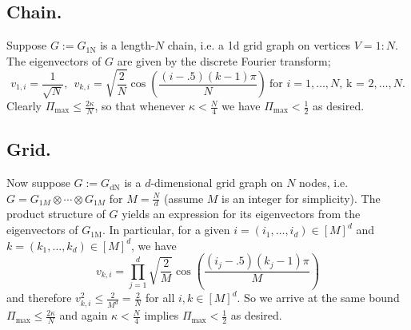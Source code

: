 \documentclass{article}
\newcommand{\1}{\mathbf{1}}
\theoremstyle{alden}
\theoremstyle{aldenthm}
\theoremstyle{definition}
\theoremstyle{remark}
\begin{document}
\subsection{Chain.}
Suppose $G := G_{\mathrm{1N}}$ is a length-$N$ chain, i.e. a 1d grid graph on vertices $V = 1:N$. The eigenvectors of $G$ are given by the discrete Fourier transform;
\begin{equation*}
v_{1,i} = \frac{1}{\sqrt{N}},~~ v_{k,i} =\sqrt{\frac{2}{N}} \cos\left(\frac{(i - .5)(k - 1)\pi}{N}\right)~ \textrm{for $i = 1,\ldots,N$, k = $2,\ldots,N$.}
\end{equation*}
Clearly $\Pi_{\max} \leq \frac{2\kappa}{N}$, so that whenever $\kappa < \frac{N}{4}$ we have $\Pi_{\max} < \frac{1}{2}$ as desired.

\subsection{Grid.}
Now suppose $G := G_{\mathrm{dN}}$ is a $d$-dimensional grid graph on $N$ nodes, i.e. $G = G_{1M} \otimes \cdots \otimes G_{1M}$ for $M = \frac{N}{d}$ (assume $M$ is an integer for simplicity). The product structure of $G$ yields an expression for its eigenvectors from the eigenvectors of $G_{\mathrm{1M}}$. In particular, for a given $i = (i_1,\ldots,i_d) \in [M]^d$ and $k = (k_1,\ldots,k_d) \in [M]^d$, we have
\begin{equation*}
v_{k,i} = \prod_{j = 1}^{d} \sqrt{\frac{2}{M}} \cos\left(\frac{(i_j - .5)(k_j - 1)\pi}{M}\right)
\end{equation*}
and therefore $v_{k,i}^2 \leq \frac{2}{M^{d}} = \frac{2}{N}$ for all $i,k \in [M]^d$. So we arrive at the same bound $\Pi_{\max} \leq \frac{2\kappa}{N}$ and again $\kappa < \frac{N}{4}$ implies $\Pi_{\max} < \frac{1}{2}$ as desired.
\end{document}
